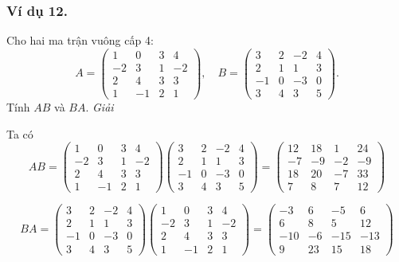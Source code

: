 \subsubsection*{Ví dụ 12.}
Cho hai ma trận vuông cấp 4:
\[
A = \begin{pmatrix}
1 & 0 & 3 & 4 \\
-2 & 3 & 1 & -2 \\
2 & 4 & 3 & 3 \\
1 & -1 & 2 & 1
\end{pmatrix}
, \quad
B = \begin{pmatrix}
3 & 2 & -2 & 4 \\
2 & 1 & 1 & 3 \\
-1 & 0 & -3 & 0 \\
3 & 4 & 3 & 5
\end{pmatrix}
.
\]
Tính \( AB \) và \( BA \).
\textit{Giải}

Ta có
\[
AB = \begin{pmatrix}
1 & 0 & 3 & 4 \\
-2 & 3 & 1 & -2 \\
2 & 4 & 3 & 3 \\
1 & -1 & 2 & 1
\end{pmatrix}
\begin{pmatrix}
3 & 2 & -2 & 4 \\
2 & 1 & 1 & 3 \\
-1 & 0 & -3 & 0 \\
3 & 4 & 3 & 5
\end{pmatrix}
= \begin{pmatrix}
12 & 18 & 1 & 24 \\
-7 & -9 & -2 & -9 \\
18 & 20 & -7 & 33 \\
7 & 8 & 7 & 12
\end{pmatrix}
\]

\[
BA = \begin{pmatrix}
3 & 2 & -2 & 4 \\
2 & 1 & 1 & 3 \\
-1 & 0 & -3 & 0 \\
3 & 4 & 3 & 5
\end{pmatrix}
\begin{pmatrix}
1 & 0 & 3 & 4 \\
-2 & 3 & 1 & -2 \\
2 & 4 & 3 & 3 \\
1 & -1 & 2 & 1
\end{pmatrix}
= \begin{pmatrix}
-3 & 6 & -5 & 6 \\
6 & 8 & 5 & 12 \\
-10 & -6 & -15 & -13 \\
9 & 23 & 15 & 18
\end{pmatrix}
\]

